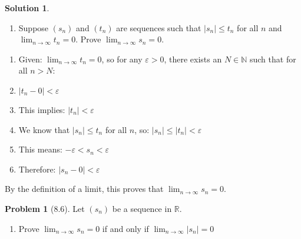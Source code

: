 \documentclass[12pt]{article}
\theoremstyle{definition} %
\newtheorem{solution}{Solution}
\newtheorem{problem}{Problem}
\theoremstyle{plain} %
\begin{document}
\begin{solution}
      \begin{enumerate}[resume]
          \item Suppose $(s_{n})$ and $(t_{n})$ are sequences such that $|s_{n}|\leq t_{n}$ for all $n$ and $\lim_{ n \to \infty }t_{n}=0$. Prove $\lim_{ n \to \infty }s_{n}=0$.
      \end{enumerate}
      \begin{enumerate}
          \item Given: $\lim_{n \to \infty} t_n = 0$, so for any $\varepsilon > 0$, there exists an $N \in \mathbb{N}$ such that for all $n > N$:
          \item $|t_n - 0| < \varepsilon$
          \item This implies: $|t_n| < \varepsilon$
          \item We know that $|s_n| \leq t_n$ for all $n$, so: $|s_n| \leq |t_n| < \varepsilon$
          \item This means: $-\varepsilon < s_n < \varepsilon$
          \item Therefore: $|s_n - 0| < \varepsilon$
      \end{enumerate}
      By the definition of a limit, this proves that $\lim_{n \to \infty} s_n = 0$. 
      
       
      \end{solution}
  
  
  \begin{problem}[8.6]
      Let $(s_{n})$ be a sequence in $\mathbb{R}$.
  \begin{enumerate}
      \item Prove $\lim_{ n \to \infty }s_{n}=0$ if and only if $\lim_{ n \to \infty }|s_{n}|=0$
  \end{enumerate}
  
  \end{problem}
  
\end{document}
